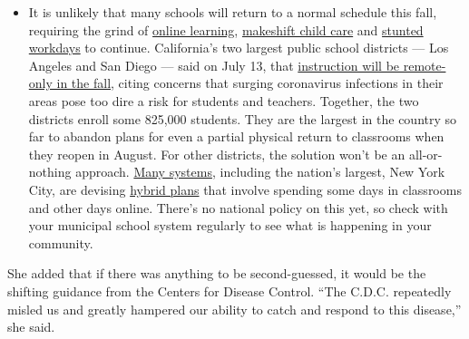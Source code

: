 \begin{itemize}
  \begin{itemize}
  \tightlist
  \item
    It is unlikely that many schools will return to a normal schedule
    this fall, requiring the grind of
    \href{https://www.nytimes.com/2020/06/05/us/coronavirus-education-lost-learning.html?action=click\&pgtype=Article\&state=default\&region=MAIN_CONTENT_3\&context=storylines_faq}{online
    learning},
    \href{https://www.nytimes.com/2020/05/29/us/coronavirus-child-care-centers.html?action=click\&pgtype=Article\&state=default\&region=MAIN_CONTENT_3\&context=storylines_faq}{makeshift
    child care} and
    \href{https://www.nytimes.com/2020/06/03/business/economy/coronavirus-working-women.html?action=click\&pgtype=Article\&state=default\&region=MAIN_CONTENT_3\&context=storylines_faq}{stunted
    workdays} to continue. California's two largest public school
    districts --- Los Angeles and San Diego --- said on July 13, that
    \href{https://www.nytimes.com/2020/07/13/us/lausd-san-diego-school-reopening.html?action=click\&pgtype=Article\&state=default\&region=MAIN_CONTENT_3\&context=storylines_faq}{instruction
    will be remote-only in the fall}, citing concerns that surging
    coronavirus infections in their areas pose too dire a risk for
    students and teachers. Together, the two districts enroll some
    825,000 students. They are the largest in the country so far to
    abandon plans for even a partial physical return to classrooms when
    they reopen in August. For other districts, the solution won't be an
    all-or-nothing approach.
    \href{https://bioethics.jhu.edu/research-and-outreach/projects/eschool-initiative/school-policy-tracker/}{Many
    systems}, including the nation's largest, New York City, are
    devising
    \href{https://www.nytimes.com/2020/06/26/us/coronavirus-schools-reopen-fall.html?action=click\&pgtype=Article\&state=default\&region=MAIN_CONTENT_3\&context=storylines_faq}{hybrid
    plans} that involve spending some days in classrooms and other days
    online. There's no national policy on this yet, so check with your
    municipal school system regularly to see what is happening in your
    community.
  \end{itemize}
\end{itemize}

She added that if there was anything to be second-guessed, it would be
the shifting guidance from the Centers for Disease Control. ``The C.D.C.
repeatedly misled us and greatly hampered our ability to catch and
respond to this disease,'' she said.

